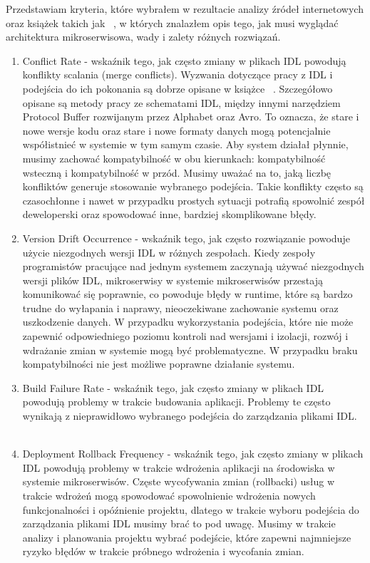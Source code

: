 \documentclass[runningheads,12pt]{llncs}
\begin{document}
Przedstawiam kryteria, które wybrałem w rezultacie analizy źródeł internetowych oraz książek takich jak ~\cite{kleppmann2017designing}, w których znalazłem opis tego, jak musi wyglądać architektura mikroserwisowa, wady i zalety różnych rozwiązań.

\begin{enumerate}
    \item Conflict Rate - wskaźnik tego, jak często zmiany w plikach IDL powodują konflikty scalania (merge conflicts). Wyzwania dotyczące pracy z IDL i podejścia do ich pokonania są dobrze opisane w książce ~\cite{kleppmann2017designing}. Szczegółowo opisane są metody pracy ze schematami IDL, między innymi narzędziem Protocol Buffer rozwijanym przez Alphabet oraz Avro. To oznacza, że stare i nowe wersje kodu oraz stare i nowe formaty danych mogą potencjalnie współistnieć w systemie w tym samym czasie. Aby system działał płynnie, musimy zachować kompatybilność w obu kierunkach: kompatybilność wsteczną i kompatybilność w przód.
    Musimy uważać na to, jaką liczbę konfliktów generuje stosowanie wybranego podejścia. Takie konflikty często są czasochłonne i nawet w przypadku prostych sytuacji potrafią spowolnić zespół deweloperski oraz spowodować inne, bardziej skomplikowane błędy. ~\cite[p. 112]{kleppmann2017designing}
    \item Version Drift Occurrence - wskaźnik tego, jak często rozwiązanie powoduje użycie niezgodnych wersji IDL w różnych zespołach. Kiedy zespoły programistów pracujące nad jednym systemem zaczynają używać niezgodnych wersji plików IDL, mikroserwisy w systemie mikroserwisów przestają komunikować się poprawnie, co powoduje błędy w runtime, które są bardzo trudne do wyłapania i naprawy, nieoczekiwane zachowanie systemu oraz uszkodzenie danych. W przypadku wykorzystania podejścia, które nie może zapewnić odpowiedniego poziomu kontroli nad wersjami i izolacji, rozwój i wdrażanie zmian w systemie mogą być problematyczne.
    W przypadku braku kompatybilności nie jest możliwe poprawne działanie systemu. ~\cite[p. 123]{kleppmann2017designing}
    \item Build Failure Rate - wskaźnik tego, jak często zmiany w plikach IDL powodują problemy w trakcie budowania aplikacji.
    Problemy te często wynikają z nieprawidłowo wybranego podejścia do zarządzania plikami IDL. ~\cite[p. 123]{kleppmann2017designing}
    \item Deployment Rollback Frequency - wskaźnik tego, jak często zmiany w plikach IDL powodują problemy w trakcie wdrożenia aplikacji na środowiska w systemie mikroserwisów.
    Częste wycofywania zmian (rollbacki) usług w trakcie wdrożeń mogą spowodować spowolnienie wdrożenia nowych funkcjonalności i opóźnienie projektu, dlatego w trakcie wyboru podejścia do zarządzania plikami IDL musimy brać to pod uwagę. Musimy w trakcie analizy i planowania projektu wybrać podejście, które zapewni najmniejsze ryzyko błędów w trakcie próbnego wdrożenia i wycofania zmian. ~\cite[p. 92]{kleppmann2017designing}
\end{enumerate}
\end{document}
